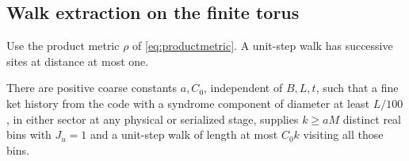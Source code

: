 \subsection{Walk extraction on the finite torus}

Use the product metric \(\rho\) of \eqref{eq:productmetric}.
A unit-step walk has successive sites at distance at most one.

\begin{lemma}
\label{lem:coherent-walk}
There are positive coarse constants \(a,C_0\), independent of
\(B,L,t\), such that a fine ket history from the code with a
syndrome component of diameter at least \(L/100\), in either
sector at any physical or serialized stage, supplies \(k\ge aM\)
distinct real bins with \(J_u=1\) and a unit-step walk of length
at most \(C_0k\) visiting all those bins.
\end{lemma}
